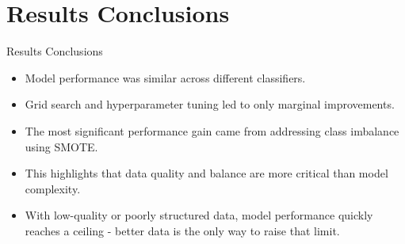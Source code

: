 \documentclass{beamer}
\begin{document}
\section{Results Conclusions}
\begin{frame}{Results Conclusions}
    \begin{itemize}
        \item Model performance was similar across different classifiers.
        \item Grid search and hyperparameter tuning led to only marginal improvements.
        \item The most significant performance gain came from addressing class imbalance using SMOTE.
        \item This highlights that data quality and balance are more critical than model complexity.
        \item With low-quality or poorly structured data, model performance quickly reaches a ceiling - better data is the only way to raise that limit.
    \end{itemize}
\end{frame}
\end{document}
